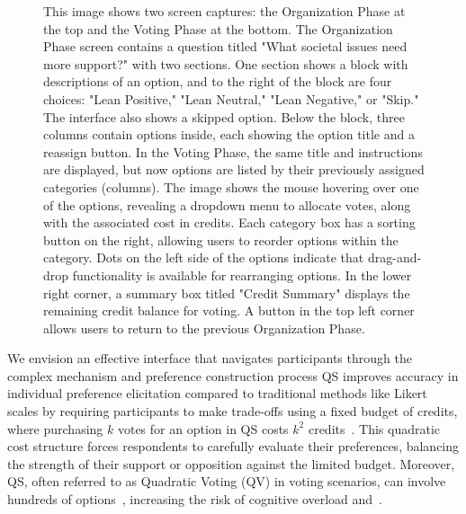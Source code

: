 \begin{figure}[ht]
{    This image shows two screen captures: the Organization Phase at the top and the Voting Phase at the bottom. The Organization Phase screen contains a question titled "What societal issues need more support?" with two sections. One section shows a block with descriptions of an option, and to the right of the block are four choices: "Lean Positive," "Lean Neutral," "Lean Negative," or "Skip." The interface also shows a skipped option. Below the block, three columns contain options inside, each showing the option title and a reassign button. In the Voting Phase, the same title and instructions are displayed, but now options are listed by their previously assigned categories (columns). The image shows the mouse hovering over one of the options, revealing a dropdown menu to allocate votes, along with the associated cost in credits. Each category box has a sorting button on the right, allowing users to reorder options within the category. Dots on the left side of the options indicate that drag-and-drop functionality is available for rearranging options. In the lower right corner, a summary box titled "Credit Summary" displays the remaining credit balance for voting. A button in the top left corner allows users to return to the previous Organization Phase.
    }

\end{figure}

We envision an effective interface that navigates participants through the complex mechanism and preference construction process QS improves accuracy in individual preference elicitation compared to traditional methods like Likert scales by requiring participants to make trade-offs using a fixed budget of credits, where purchasing $k$ votes for an option in QS costs $k^2$ credits~\cite{quarfoot2017quadratic,chengCanShowWhat2021}. This quadratic cost structure forces respondents to carefully evaluate their preferences, balancing the strength of their support or opposition against the limited budget.  Moreover, QS, often referred to as Quadratic Voting (QV) in voting scenarios, can involve hundreds of options~\cite{rogersColoradoTriedNew2019, teamTaiwanDigitalMinister}, increasing the risk of cognitive overload and~.

